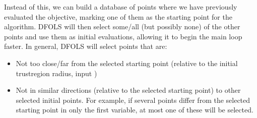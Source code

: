 \documentclass[letterpaper,10pt,english]{sphinxmanual}
\begin{document}
\sphinxAtStartPar
Instead of this, we can build a database of points where we have previously evaluated the objective, marking one of them as the starting point
for the algorithm. DFO\sphinxhyphen{}LS will then select some/all (but possibly none) of the other points and use them as initial evaluations, allowing it to begin
the main loop faster. In general, DFO\sphinxhyphen{}LS will select points that are:
\begin{itemize}
\item {} 
\sphinxAtStartPar
Not too close/far from the selected starting point (relative to the initial trust\sphinxhyphen{}region radius, input )

\item {} 
\sphinxAtStartPar
Not in similar directions (relative to the selected starting point) to other selected initial points. For example, if several points differ from
the selected starting point in only the first variable, at most one of these will be selected.

\end{itemize}
\end{document}
